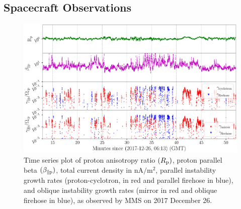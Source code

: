         \subsection{Spacecraft Observations} \label{sec:spcr5}

            \begin{figure}
                \begin{center}
                    \includegraphics[width=1.\textwidth]{figures/chap5/mms_all_piecewise_2017-12-26_2017-12-26_00000108_00015707.pdf}
                    \caption[Time series plot of $\beta_{\parallel \rm p}, R_{\rm p}, J_z
                             \mathrm{\,and\,} \gamma$ for \texttt{mms} dataset]{Time series plot of
                             proton anisotropy ratio $(R_{\rm p})$, proton parallel beta
                             $(\beta_{\parallel \rm p})$, total current density in
                             $\mathrm{nA/m^2}$, parallel instability growth rates (proton-cyclotron,
                             in red and parallel firehose in blue), and oblique instability growth
                             rates (mirror in red and oblique firehose in blue), as observed by MMS
                             on 2017 December 26.}
                    \label{fig:brjmms}
                \end{center}
            \end{figure}

